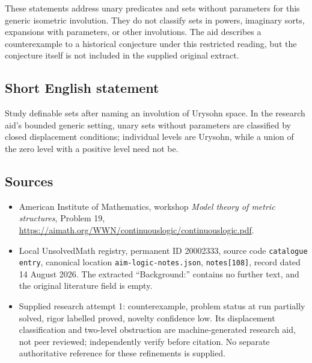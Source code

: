 \documentclass[11pt]{article}
\begin{document}
These statements address unary predicates and sets without parameters for this generic isometric involution. They do not classify sets in powers, imaginary sorts, expansions with parameters, or other involutions. The aid describes a counterexample to a historical conjecture under this restricted reading, but the conjecture itself is not included in the supplied original extract.
\subsection{Short English statement}
Study definable sets after naming an involution of Urysohn space. In the research aid's bounded generic setting, unary sets without parameters are classified by closed displacement conditions; individual levels are Urysohn, while a union of the zero level with a positive level need not be.
\subsection{Sources}
\begin{itemize}
\item American Institute of Mathematics, workshop \emph{Model theory of metric structures}, Problem 19, \url{https://aimath.org/WWN/continuouslogic/continuouslogic.pdf}.
\item Local UnsolvedMath registry, permanent ID 20002333, source code \texttt{catalogue entry}, canonical location \texttt{aim-logic-notes.json}, \texttt{notes[108]}, record dated 14 August 2026. The extracted ``Background:'' contains no further text, and the original literature field is empty.
\item Supplied research attempt 1: counterexample, problem status at run partially solved, rigor labelled proved, novelty confidence low. Its displacement classification and two-level obstruction are machine-generated research aid, not peer reviewed; independently verify before citation. No separate authoritative reference for these refinements is supplied.
\end{itemize}
\end{document}

